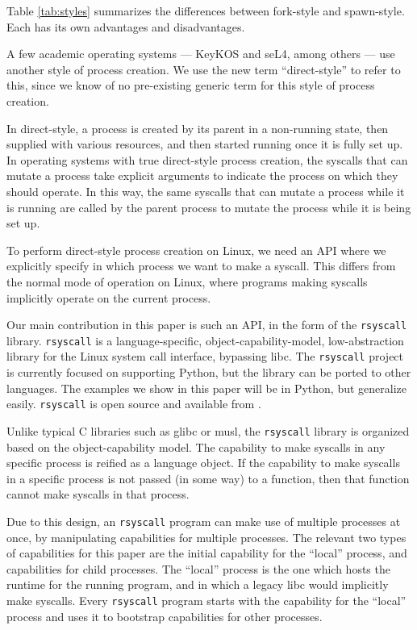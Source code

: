 \documentclass[letterpaper,twocolumn,10pt]{article}
\begin{document}
Table \ref{tab:styles} summarizes the differences between fork-style and spawn-style.
Each has its own advantages and disadvantages.

A few academic operating systems
--- KeyKOS\cite{keykos} and seL4\cite{sel4}, among others\cite{exokernel}\cite{fuchsia}\cite{singularity} ---
use another style of process creation.
We use the new term ``direct-style'' to refer to this,
since we know of no pre-existing generic term for this style of process creation.

In direct-style, a process is created by its parent in a non-running state,
then supplied with various resources,
and then started running once it is fully set up.
In operating systems with true direct-style process creation,
the syscalls that can mutate a process
take explicit arguments to indicate the process on which they should operate\cite{keykos}\cite{sel4}.
In this way, the same syscalls that can mutate a process while it is running
are called by the parent process to mutate the process while it is being set up.

To perform direct-style process creation on Linux,
we need an API where we explicitly specify in which process we want to make a syscall.
This differs from the normal mode of operation on Linux,
where programs making syscalls implicitly operate on the current process.

Our main contribution in this paper is such an API, in the form of the \texttt{rsyscall} library.
\texttt{rsyscall} is a
language-specific, object-capability-model, low-abstraction library for the Linux system call interface,
bypassing libc\cite{capmyths}\cite{robust_composition}.
The \texttt{rsyscall} project is currently focused on supporting Python,
but the library can be ported to other languages.
The examples we show in this paper will be in Python,
but generalize easily.
\texttt{rsyscall} is open source and available from
\githuburl{}.

Unlike typical C libraries such as glibc or musl,
the \texttt{rsyscall} library is organized based on the object-capability model\cite{capmyths}\cite{robust_composition}.
The capability to make syscalls in any specific process is reified as a language object.
If the capability to make syscalls in a specific process is not passed (in some way) to a function,
then that function cannot make syscalls in that process.

Due to this design, an \texttt{rsyscall} program can make use of multiple processes at once,
by manipulating capabilities for multiple processes.
The relevant two types of capabilities for this paper are the initial capability for the ``local'' process,
and capabilities for child processes.
The ``local'' process is the one which hosts the runtime for the running program,
and in which a legacy libc would implicitly make syscalls.
Every \texttt{rsyscall} program starts with the capability for the ``local'' process
and uses it to bootstrap capabilities for other processes.
\end{document}
